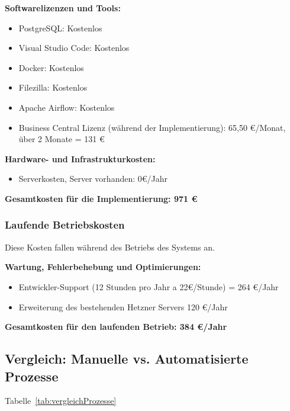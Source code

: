 	\textbf{Softwarelizenzen und Tools:}
    \begin{itemize}
        \item PostgreSQL: Kostenlos
        \item Visual Studio Code: Kostenlos
        \item Docker: Kostenlos
        \item Filezilla: Kostenlos
        \item Apache Airflow: Kostenlos
        \item Business Central Lizenz (während der Implementierung): 65,50 €/Monat, über 2 Monate = 131 € 
    \end{itemize}

	\textbf{Hardware- und Infrastrukturkosten:}
    \begin{itemize}
        \item Serverkosten, Server vorhanden: 0€/Jahr
    \end{itemize}
        
	\textbf{Gesamtkosten für die Implementierung: 971 €}

\subsubsection{Laufende Betriebskosten}
\label{Betriebskosten}

Diese Kosten fallen während des Betriebs des Systems an.

\textbf{Wartung, Fehlerbehebung und Optimierungen:}
\begin{itemize}
    \item Entwickler-Support (12 Stunden pro Jahr a 22€/Stunde) = 264 €/Jahr
    \item Erweiterung des bestehenden Hetzner Servers 120 €/Jahr
\end{itemize}

\textbf{Gesamtkosten für den laufenden Betrieb: 384 €/Jahr }

\clearpage

\subsection{Vergleich: Manuelle vs. Automatisierte Prozesse}
\label{vergleichProzesse}
Tabelle~\ref{tab:vergleichProzesse}
\\



















